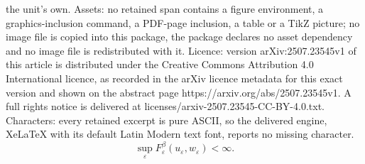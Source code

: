 \documentclass[10pt,a4paper]{amsart}
\newcommand\e{\varepsilon}
\begin{document}
the unit's own. Assets: no retained span contains a figure environment, a graphics-inclusion command, a PDF-page inclusion, a table or a TikZ picture; no image file is copied into this package, the package declares no asset dependency and no image file is redistributed with it. Licence: version arXiv:2507.23545v1 of this article is distributed under the Creative Commons Attribution 4.0 International licence, as recorded in the arXiv licence metadata for this exact version and shown on the abstract page https://arxiv.org/abs/2507.23545v1. A full rights notice is delivered at licenses/arxiv-2507.23545-CC-BY-4.0.txt. Characters: every retained excerpt is pure ASCII, so the delivered engine, XeLaTeX with its default Latin Modern text font, reports no missing character.
	\begin{equation}\label{cmp00}
		\sup_{\e} F_{\e}^{\beta}(u_\e, w_{\e}) <\infty.
	\end{equation}
\end{document}
